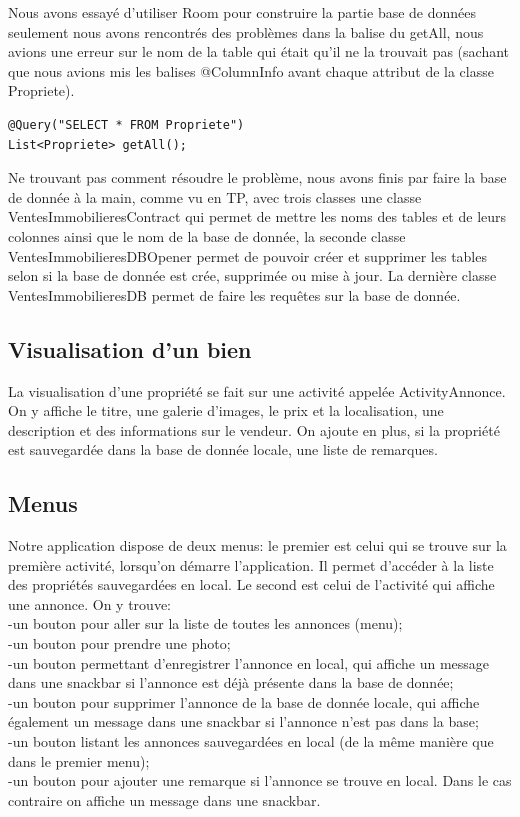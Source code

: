 \documentclass[a4paper,12pt]{article} %
\begin{document}
Nous avons essayé d'utiliser Room pour construire la partie base de données seulement nous avons rencontrés des problèmes dans la balise du getAll, nous avions une erreur sur le nom de la table qui était qu'il ne la trouvait pas (sachant que nous avions mis les balises @ColumnInfo avant chaque attribut de la classe Propriete).
\begin{lstlisting}
@Query("SELECT * FROM Propriete")
List<Propriete> getAll();
\end{lstlisting}

Ne trouvant pas comment résoudre le problème, nous avons finis par faire la base de donnée à la main, comme vu en TP, avec trois classes une classe VentesImmobilieresContract qui permet de mettre les noms des tables et de leurs colonnes ainsi que le nom de la base de donnée, la seconde classe VentesImmobilieresDBOpener permet de pouvoir créer et supprimer les tables selon si la base de donnée est crée, supprimée ou mise à jour. La dernière classe VentesImmobilieresDB permet de faire les requêtes sur la base de donnée.  

\subsection{Visualisation d'un bien}
La visualisation d'une propriété se fait sur une activité appelée ActivityAnnonce.
On y affiche le titre, une galerie d'images, le prix et la localisation, une description et des informations sur le vendeur. On ajoute en plus, si la propriété est sauvegardée dans la base de donnée locale, une liste de remarques.

\subsection{Menus}
Notre application dispose de deux menus: le premier est celui qui se trouve sur la première activité, lorsqu'on démarre l'application. Il permet d'accéder à la liste des propriétés sauvegardées en local. Le second est celui de l'activité qui affiche une annonce. On y trouve:\\
    -un bouton pour aller sur la liste de toutes les annonces (menu);\\
    -un bouton pour prendre une photo;\\
    -un bouton permettant d'enregistrer l'annonce en local, qui affiche un message dans une snackbar si l'annonce est déjà présente dans la base de donnée;\\
    -un bouton pour supprimer l'annonce de la base de donnée locale, qui affiche également un message dans une snackbar si l'annonce n'est pas dans la base;\\
    -un bouton listant les annonces sauvegardées en local (de la même manière que dans le premier menu);\\
    -un bouton pour ajouter une remarque si l'annonce se trouve en local. Dans le cas contraire on affiche un message dans une snackbar.
\end{document}
